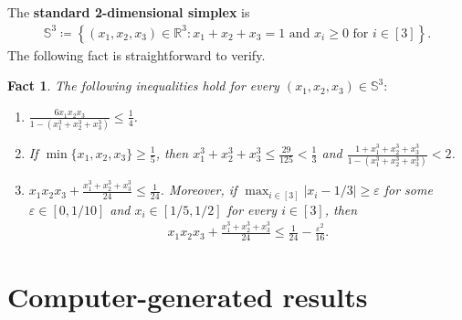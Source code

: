 \documentclass[11pt,a4paper]{article}
\newtheorem{fact}[definition]{Fact}
\theoremstyle{remark}
\begin{document}
The \textbf{standard 2-dimensional simplex} is
\begin{align*}
    \mathbb{S}^3 
    \coloneqq \left\{(x_1, x_2, x_3) \in \mathbb{R}^3 \colon x_1+x_2+x_3 = 1 \text{ and } x_i \ge 0 \text{ for } i \in [3]\right\}.
\end{align*}
%
The following fact is straightforward to verify. 
%
\begin{fact}\label{FACT:ineqality}
    The following inequalities hold for every $(x_1, x_2, x_3) \in \mathbb{S}^{3}$$\colon$ 
    \begin{enumerate}[label=(\roman*)]
        \item\label{FACT:ineqality-1} $\frac{6x_1x_2x_3}{1-(x_1^3+x_2^3+x_3^3)} \le \frac{1}{4}$. 
        \item\label{FACT:ineqality-2} If $\min\{x_1, x_2, x_3\} \ge \frac{1}{5}$, then $x_1^3+x_2^3+x_3^3\le \frac{29}{125}<\frac13$ and $\frac{1+x_1^3+x_2^3+x_3^3}{1-(x_1^3+x_2^3+x_3^3)} < 2$. 
        \item\label{FACT:ineqality-3} $x_1 x_2 x_3 + \frac{x_1^3 + x_2^3 + x_3^3}{24} \le \frac{1}{24}$. Moreover, if $\max_{i\in [3]}\left|x_i - 1/3\right| \ge \varepsilon$ for some $\varepsilon \in [0, 1/10]$ and $x_i \in [1/5, 1/2]$ for every $i \in [3]$, then 
        \begin{align*}
            x_1 x_2 x_3 + \frac{x_1^3 + x_2^3 + x_3^3}{24}
            \le \frac{1}{24} - \frac{\varepsilon^2}{16}. 
        \end{align*}
    \end{enumerate}
\end{fact}




\section{Computer-generated results}\label{se:Flag-Algebra}
\end{document}
